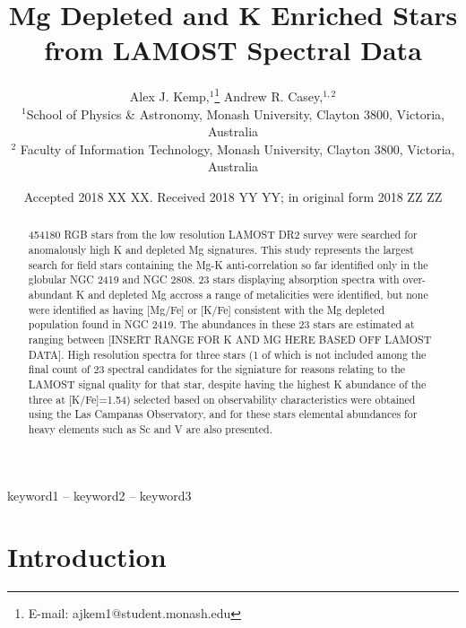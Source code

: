 \documentclass[a4paper,fleqn,usenatbib]{mnras}
\title[Short title, max. 45 characters]{Mg Depleted and K Enriched Stars from LAMOST Spectral Data}
\author[Kemp et al.]{
Alex J. Kemp,$^{1}$\thanks{E-mail: ajkem1@student.monash.edu}
Andrew R. Casey,$^{1,2}$
\\
$^{1}$School of Physics \& Astronomy, Monash University, Clayton 3800, Victoria, Australia\\
$^{2}$ Faculty of Information Technology, Monash University, Clayton 3800, Victoria, Australia\\
}
\date{Accepted 2018 XX XX. Received 2018 YY YY; in original form 2018 ZZ ZZ}
\begin{document}
\label{firstpage}
\pagerange{\pageref{firstpage}--\pageref{lastpage}}
\maketitle

\begin{abstract}
454180 RGB stars from the low resolution LAMOST DR2 survey were searched for anomalously high K and depleted Mg signatures. This study represents the largest search for field stars containing the Mg-K anti-correlation so far identified only in the globular NGC 2419 and NGC 2808. 23 stars displaying absorption spectra with over-abundant K and depleted Mg accross a range of metalicities were identified, but none were identified as having [Mg/Fe] or [K/Fe] consistent with the Mg depleted population found in NGC 2419. The abundances in these 23 stars are estimated at ranging between [INSERT RANGE FOR K AND MG HERE BASED OFF LAMOST DATA]. High resolution spectra for three stars (1 of which is not included among the final count of 23 spectral candidates for the signiature for reasons relating to the LAMOST signal quality for that star, despite having the highest K abundance of the three at [K/Fe]=1.54) selected based on observability characteristics were obtained using the Las Campanas Observatory, and for these stars elemental abundances for heavy elements such as Sc and V are also presented.
\end{abstract}

\begin{keywords}
keyword1 -- keyword2 -- keyword3
\end{keywords}



\section{Introduction}
\end{document}
